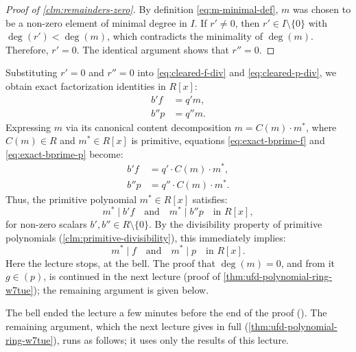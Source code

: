 \begin{proofWrapper}
\begin{content}
\begin{proof}[Proof of \cref{clm:remainders-zero}]
By definition \eqref{eq:m-minimal-def}, $m$ was chosen to be a non-zero element of minimal degree in $I$.
If $r' \neq 0$, then $r' \in I \setminus \{0\}$ with $\deg(r') < \deg(m)$, which contradicts the minimality of $\deg(m)$. Therefore, $r' = 0$.
The identical argument shows that $r'' = 0$.
\end{proof}

\begin{steps}
Substituting $r' = 0$ and $r'' = 0$ into \eqref{eq:cleared-f-div} and \eqref{eq:cleared-p-div}, we obtain exact factorization identities in $R[x]$:
\begin{align}
b' f &= q' m, \label{eq:exact-bprime-f} \\
b'' p &= q'' m. \label{eq:exact-bprime-p}
\end{align}
Expressing $m$ via its canonical content decomposition $m = C(m) \cdot m^*$, where $C(m) \in R$ and $m^* \in R[x]$ is primitive, equations \eqref{eq:exact-bprime-f} and \eqref{eq:exact-bprime-p} become:
\begin{align}
b' f &= q' \cdot C(m) \cdot m^*, \label{eq:div-bprime-f-mstar} \\
b'' p &= q'' \cdot C(m) \cdot m^*. \label{eq:div-bprime-p-mstar}
\end{align}
Thus, the primitive polynomial $m^* \in R[x]$ satisfies:
\[
m^* \mid b' f \quad \text{and} \quad m^* \mid b'' p \quad \text{in } R[x],
\]
for non-zero scalars $b', b'' \in R \setminus \{0\}$.
By the divisibility property of primitive polynomials (\cref{clm:primitive-divisibility}), this immediately implies:
\[
m^* \mid f \quad \text{and} \quad m^* \mid p \quad \text{in } R[x].
\]
Here the lecture stops, at the bell. The proof that $\deg(m) = 0$, and from it $g \in (p)$, is continued in the next lecture (proof of \cref{thm:ufd-polynomial-ring-w7tue}); the remaining argument is given below.
\end{steps}
\end{content}

\begin{content}
\begin{steps}
The bell ended the lecture a few minutes before the end of the proof (). The remaining argument, which the next lecture gives in full (\cref{thm:ufd-polynomial-ring-w7tue}), runs as follows; it uses only the results of this lecture.


\end{steps}
\end{content}
\end{proofWrapper}
